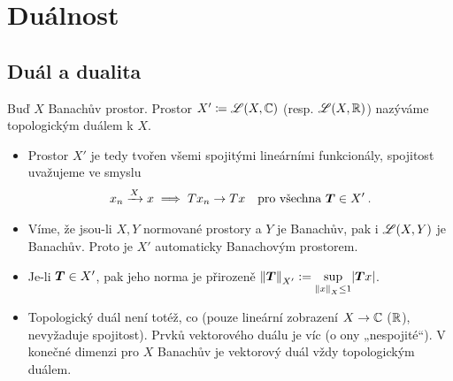 %





\section{Duálnost}

\subsection{Duál a dualita}

\begin{definition}[Duál]
Buď $X$ Banachův prostor. Prostor $X' \coloneqq \mathscr{L}(X,\mathbb{C})$ \hspace{0.5em} (resp. $\mathscr{L}(X, \mathbb{R})$) nazýváme topologickým duálem k $X$.
\end{definition}

\begin{remark} 
\begin{itemize}
    \item Prostor $X'$ je tedy tvořen všemi spojitými lineárními funkcionály, spojitost uvažujeme ve smyslu \begin{align*}
        x_n \xrightarrow{X} x \implies T x_n \to T x \quad \text{pro všechna } \boldsymbol{T} \in X' \:.
    \end{align*}
    \item Víme, že jsou-li $X,Y$ normované prostory a $Y$ je Banachův, pak i $\mathscr{L} (X,Y)$ je Banachův. Proto je $X'$ automaticky Banachovým prostorem.
    \item Je-li $\boldsymbol{T} \in X'$, pak jeho norma je přirozeně $\left\lVert\boldsymbol{T}\right\rVert_{X'} := \underset{\left\lVert x\right\rVert_X \leq 1}{\sup} |\boldsymbol{T}x|$.
    \item Topologický duál není totéž, co  (pouze lineární zobrazení $X \to \mathbb{C}$ ($\mathbb{R}$), nevyžaduje spojitost). Prvků vektorového duálu je víc (o ony „nespojité“). V konečné dimenzi pro $X$ Banachův je vektorový duál vždy topologickým duálem.
\end{itemize}
\end{remark}


